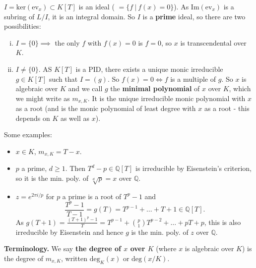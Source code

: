 \documentclass{article}
\theoremstyle{definition}
\begin{document}
$I = \text{ker}(\text{ev}_x) \subset K[T]$ is an ideal ( $= \{f ~|~ f(x)=0\}$). As $\text{Im}(\text{ev}_x)$ is a subring of $L/I$, it is an integral domain. So $I$ is a \textbf{prime} ideal, so there are two possibilities:
\begin{enumerate}[(i)]
    \item $I = \{0\} \implies $ the only $f$ with $f(x)=0$ is $f=0$, so $x$ is transcendental over $K$.
    \item $I \neq \{0\}$. AS $K[T]$ is a PID, there exists a unique monic irreducible $g \in K[T]$ such that $I = (g)$. So $f(x) = 0 \iff f$ is a multiple of $g$. So $x$ is algebraic over $K$ and we call $g$ the \textbf{minimal polynomial} of $x$ over $K$, which we might write as $m_{x,K}$. It is the unique irreducible monic polynomial with $x$ as a root (and is the monic polynomial of least degree with $x$ as a root - this depends on $K$ as well as $x$).
\end{enumerate}
Some examples:
\begin{itemize}
    \item $x \in K$, $m_{x,K} = T-x$.
    \item $p$ a prime, $d \ge 1$. Then $T^d - p \in \mathbb{Q}[T]$ is irreducible by Eisenstein's criterion, so it is the min. poly. of $\sqrt[d]{p} = x$ over $\mathbb{Q}$.
    \item $z = e^{2 \pi i/p}$ for $p$ a prime is a root of $T^p - 1$ and $$\frac{T^p-1}{T-1} = g(T) = T^{p-1} + \ldots + T + 1 \in \mathbb{Q}[T].$$
    As $g(T+1) = \frac{(T+1)^p - 1}{T} = T^{p-1} + {{p} \choose {1}} T^{p-2} + \ldots + pT + p$, this is also irreducible by Eisenstein and hence $g$ is the min. poly. of $z$ over $\mathbb{Q}$.
\end{itemize}
\textbf{Terminology.} We say \textbf{the degree of $x$ over $K$} (where $x$ is algebraic over $K$) is the degree of $m_{x,K}$, written $\text{deg}_K(x)$ or $\text{deg}(x/K)$.
\vspace{1mm}
\end{document}
